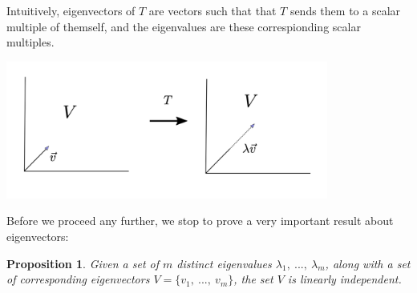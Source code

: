 \documentclass[10pt, oneside]{article}
\newtheorem{prop}{Proposition}
\begin{document}
      Intuitively, eigenvectors of $T$ are vectors such that that $T$ sends them to a scalar multiple
      of themself, and the eigenvalues are these correspionding scalar multiples.

      \begin{center}
        \includegraphics[width=300pt]{assets/eig.png}
      \end{center}

      Before we proceed any further, we stop to prove a very important result about eigenvectors:

      \begin{prop}
      Given a set of $m$ distinct eigenvalues $\lambda_1, \ ..., \ \lambda_m$, along with a set of corresponding eigenvectors $V = \{v_1, \ ..., \ v_m\}$, the
      set $V$ is linearly independent.
    \end{prop}
\end{document}
